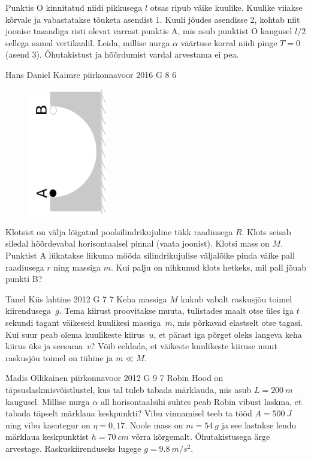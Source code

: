 \documentclass[11pt, twoside]{article}
\begin{document}
{{Punktis O kinnitatud niidi pikkusega $l$ otsas ripub väike kuulike. Kuulike viiakse kõrvale ja vabastatakse tõuketa asendist 1. Kuuli jõudes asendisse 2, kohtab niit joonise tasandiga risti olevat varrast punktis A, mis asub punktist O kaugusel $l/2$ sellega samal vertikaalil. Leida, millise nurga $\alpha$ väärtuse korral niidi pinge $T=0$ (asend 3). Õhutakistust ja hõõrdumist vardal arvestama ei pea.
\fi
}

{Hans Daniel Kaimre} %
{piirkonnavoor} %
{2016} %
{G 8} %
{6} %
{
\ifStatement
\begin{figure}
	\vspace{-15pt}
	\includegraphics[angle=-90,origin=c,width=0.3\textwidth]{2016-v2g-08-halfpipe.pdf}
\end{figure}
Klotsist on välja lõigatud poolsilindrikujuline tükk raadiusega $R$. Klots seisab siledal hõõrdevabal horisontaalsel pinnal (vaata joonist). Klotsi mass on $M$. Punktist A lükatakse liikuma mööda silindrikujulise väljalõike pinda väike pall raadiusega $r$ ning massiga $m$. Kui palju on nihkunud klots hetkeks, mil pall jõuab punkti B?
\fi
}

{Tanel Kiis} %
{lahtine} %
{2012} %
{G 7} %
{7} %
{
\ifStatement
Keha massiga $M$ kukub vabalt raskusjõu toimel kiirendusega~$g$. Tema
kiirust proovitakse muuta, tulistades maalt otse üles iga $t$ sekundi tagant
väikeseid kuulikesi massiga~$m$, mis põrkavad elastselt otse tagasi.
Kui suur peab olema kuulikeste kiirus~$u$, et pärast iga põrget oleks langeva
keha kiirus üks ja seesama~$v$? Võib eeldada, et väikeste kuulikeste kiiruse muut raskusjõu toimel on
tühine ja $m\ll M$.
\fi
}

{Madis Ollikainen} %
{piirkonnavoor} %
{2012} %
{G 9} %
{7} %
{
\ifStatement
Robin Hood on täpsuslaskmisvõistlustel, kus tal tuleb tabada märklauda, mis asub
$L=\SI{200}{m}$ kaugusel.  Millise nurga $\alpha$ all horisontaalsihi suhtes
peab Robin vibust laskma, et tabada täpselt märklaua keskpunkti? Vibu vinnamisel
teeb ta tööd $A=\SI{500}{J}$ ning vibu kasutegur on $\eta=0,17$. Noole mass on
$m=\SI{54}{g}$ ja see lastakse lendu märklaua keskpunktist $h=\SI{70}{cm}$ võrra
kõrgemalt.  Õhutakistusega ärge arvestage.  Raskuskiirenduseks lugege
$g=\SI{9,8}{m/s^2}$.
\fi
}

}
\end{document}
